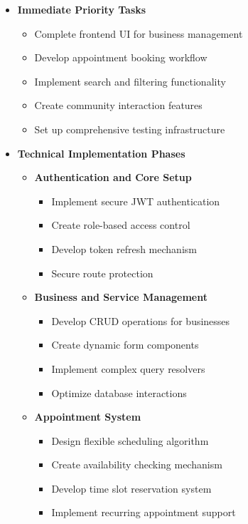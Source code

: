 \begin{itemize}
\begin{itemize}[label=-]
        \item \textbf{Immediate Priority Tasks}
        \begin{itemize}
            \item Complete frontend UI for business management
            \item Develop appointment booking workflow
            \item Implement search and filtering functionality
            \item Create community interaction features
            \item Set up comprehensive testing infrastructure
        \end{itemize}

        \item \textbf{Technical Implementation Phases}
        \begin{itemize}
            \item \textbf{Authentication and Core Setup}
            \begin{itemize}
                \item Implement secure JWT authentication
                \item Create role-based access control
                \item Develop token refresh mechanism
                \item Secure route protection
            \end{itemize}

            \item \textbf{Business and Service Management}
            \begin{itemize}
                \item Develop CRUD operations for businesses
                \item Create dynamic form components
                \item Implement complex query resolvers
                \item Optimize database interactions
            \end{itemize}

            \item \textbf{Appointment System}
            \begin{itemize}
                \item Design flexible scheduling algorithm
                \item Create availability checking mechanism
                \item Develop time slot reservation system
                \item Implement recurring appointment support
            \end{itemize}


\end{itemize}
\end{itemize}
\end{itemize}
